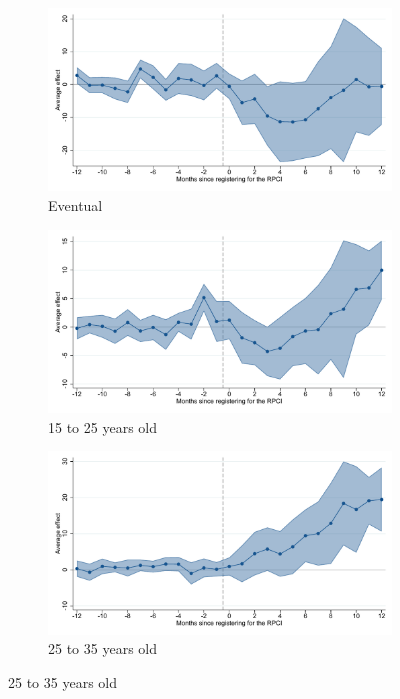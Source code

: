 \begin{figure}[H]
    \begin{subfigure}{0.32\textwidth}
    \caption{Eventual}
    \includegraphics[width=\textwidth]{04_Figures/muestra_10porciento/event_study_sal_formal_base_te_dcdh_connected.pdf}
    \end{subfigure}
    \begin{subfigure}{0.32\textwidth}
    \caption{15 to 25 years old}
    \includegraphics[width=\textwidth]{04_Figures/muestra_10porciento/event_study_sal_formal_age_15_25_dcdh_connected.pdf}
    \end{subfigure}
    \begin{subfigure}{0.32\textwidth}
    \caption{25 to 35 years old}
    \includegraphics[width=\textwidth]{04_Figures/muestra_10porciento/event_study_sal_formal_age_25_35_dcdh_connected.pdf}
    \end{subfigure}


\end{figure}
